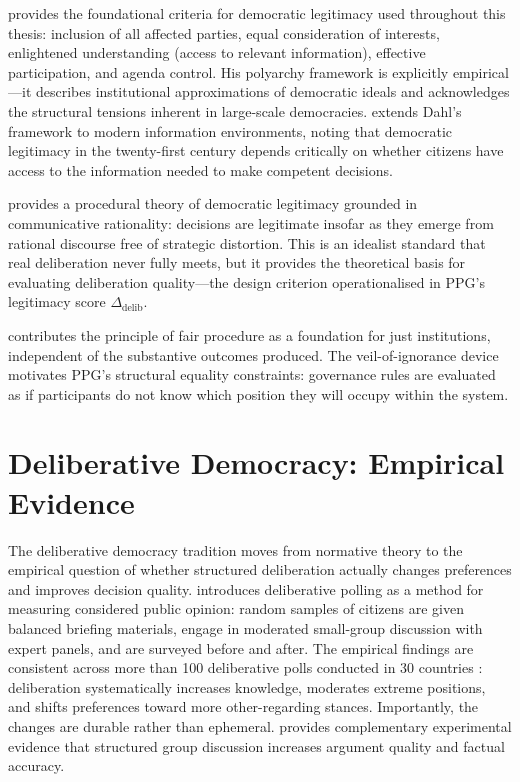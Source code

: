 \documentclass[12pt,a4paper,oneside]{report}
\begin{document}
\citet{dahl1989democracy} provides the foundational criteria for democratic legitimacy used throughout this thesis: inclusion of all affected parties, equal consideration of interests, enlightened understanding (access to relevant information), effective participation, and agenda control. His polyarchy framework is explicitly empirical---it describes institutional approximations of democratic ideals and acknowledges the structural tensions inherent in large-scale democracies. \citet{lupia2006dahl} extends Dahl's framework to modern information environments, noting that democratic legitimacy in the twenty-first century depends critically on whether citizens have access to the information needed to make competent decisions.

\citet{habermas1996between} provides a procedural theory of democratic legitimacy grounded in communicative rationality: decisions are legitimate insofar as they emerge from rational discourse free of strategic distortion. This is an idealist standard that real deliberation never fully meets, but it provides the theoretical basis for evaluating deliberation quality---the design criterion operationalised in PPG's legitimacy score $\Delta_{\text{delib}}$.

\citet{rawls1971theory} contributes the principle of fair procedure as a foundation for just institutions, independent of the substantive outcomes produced. The veil-of-ignorance device motivates PPG's structural equality constraints: governance rules are evaluated as if participants do not know which position they will occupy within the system.

\section{Deliberative Democracy: Empirical Evidence}

The deliberative democracy tradition moves from normative theory to the empirical question of whether structured deliberation actually changes preferences and improves decision quality. \citet{fishkin1991democracy} introduces deliberative polling as a method for measuring considered public opinion: random samples of citizens are given balanced briefing materials, engage in moderated small-group discussion with expert panels, and are surveyed before and after. The empirical findings are consistent across more than 100 deliberative polls conducted in 30 countries \citep{fishkin2018stanford}: deliberation systematically increases knowledge, moderates extreme positions, and shifts preferences toward more other-regarding stances. Importantly, the changes are durable rather than ephemeral. \citet{dutwin2003character} provides complementary experimental evidence that structured group discussion increases argument quality and factual accuracy.
\end{document}
